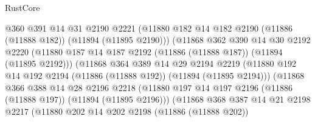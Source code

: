 \begin{lexlean}{RustCore}
\begin{coremodule}
                          @360
                          @391
                          @14
                          @31
                          @2190
                          @2221
                          (@11880
                            @182
                            @14
                            @182
                            @2190
                            (@11886 (@11888 @182))
                            (@11894 (@11895 @2190)))
                          (@11868
                            @362
                            @390
                            @14
                            @30
                            @2192
                            @2220
                            (@11880
                              @187
                              @14
                              @187
                              @2192
                              (@11886 (@11888 @187))
                              (@11894 (@11895 @2192)))
                            (@11868
                              @364
                              @389
                              @14
                              @29
                              @2194
                              @2219
                              (@11880
                                @192
                                @14
                                @192
                                @2194
                                (@11886 (@11888 @192))
                                (@11894 (@11895 @2194)))
                              (@11868
                                @366
                                @388
                                @14
                                @28
                                @2196
                                @2218
                                (@11880
                                  @197
                                  @14
                                  @197
                                  @2196
                                  (@11886 (@11888 @197))
                                  (@11894 (@11895 @2196)))
                                (@11868
                                  @368
                                  @387
                                  @14
                                  @21
                                  @2198
                                  @2217
                                  (@11880
                                    @202
                                    @14
                                    @202
                                    @2198
                                    (@11886 (@11888 @202))

\end{coremodule}
\end{lexlean}
